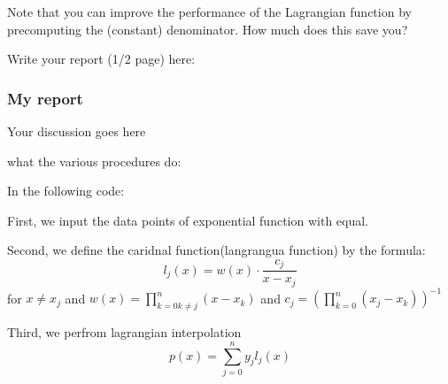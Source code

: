 \documentclass[11pt]{article}
\begin{document}
Note that you can improve the performance of the Lagrangian function by
precomputing the (constant) denominator. How much does this save you?

Write your report (1/2 page) here:

\subsubsection{My report}\label{my-report}

Your discussion goes here

    what the various procedures do:

In the following code:

First, we input the data points of exponential function with equal.

Second, we define the caridnal function(langrangua function) by the
formula: \[l_j(x) = w(x) \cdot \frac{c_j}{x-x_j}\] for \(x\neq x_j\) and
\(w(x) = \prod_{k=0 k\neq j}^n (x-x_k)\) and
\(c_j = \left(\prod_{k=0}^n (x_j-x_k)\right)^{-1}\)

Third, we perfrom lagrangian interpolation
\[p(x) = \sum_{j=0}^n y_j l_j(x)\]
\end{document}
